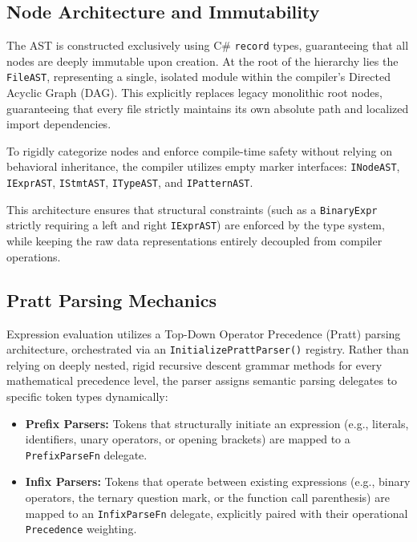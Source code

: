 \documentclass[11pt, a4paper]{article}
\begin{document}
\subsection{Node Architecture and Immutability}

The AST is constructed exclusively using C\# \texttt{record} types, guaranteeing that all nodes are deeply immutable upon creation. At the root of the hierarchy lies the \texttt{FileAST}, representing a single, isolated module within the compiler's Directed Acyclic Graph (DAG). This explicitly replaces legacy monolithic root nodes, guaranteeing that every file strictly maintains its own absolute path and localized import dependencies.

To rigidly categorize nodes and enforce compile-time safety without relying on behavioral inheritance, the compiler utilizes empty marker interfaces: \texttt{INodeAST}, \texttt{IExprAST}, \texttt{IStmtAST}, \texttt{ITypeAST}, and \texttt{IPatternAST}. 

This architecture ensures that structural constraints (such as a \texttt{BinaryExpr} strictly requiring a left and right \texttt{IExprAST}) are enforced by the type system, while keeping the raw data representations entirely decoupled from compiler operations.
\subsection{Pratt Parsing Mechanics}

Expression evaluation utilizes a Top-Down Operator Precedence (Pratt) parsing architecture, orchestrated via an \texttt{InitializePrattParser()} registry. Rather than relying on deeply nested, rigid recursive descent grammar methods for every mathematical precedence level, the parser assigns semantic parsing delegates to specific token types dynamically:

\begin{itemize}
    \item \textbf{Prefix Parsers:} Tokens that structurally initiate an expression (e.g., literals, identifiers, unary operators, or opening brackets) are mapped to a \texttt{PrefixParseFn} delegate.
    \item \textbf{Infix Parsers:} Tokens that operate between existing expressions (e.g., binary operators, the ternary question mark, or the function call parenthesis) are mapped to an \texttt{InfixParseFn} delegate, explicitly paired with their operational \texttt{Precedence} weighting.
\end{itemize}
\end{document}

